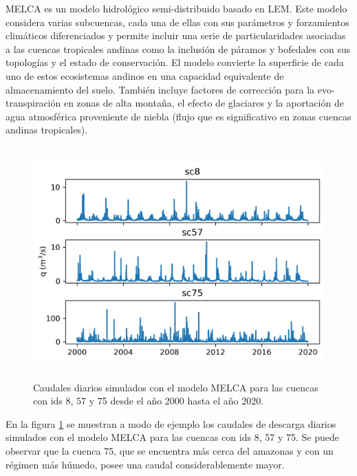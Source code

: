 MELCA es un modelo hidrológico semi-distribuido basado en LEM. 
Este modelo considera varias subcuencas, cada una de ellas con sus parámetros y forzamientos climáticos diferenciados
y permite incluir una serie de particularidades asociadas a las cuencas tropicales andinas como la inclusión de páramos 
y bofedales con sus topologías y el estado de conservación. El modelo convierte la superficie de cada uno de estos 
ecosistemas andinos en una capacidad equivalente de almacenamiento del suelo. 
También  incluye factores de corrección para  la evo-transpiración en zonas de alta montaña, el efecto de glaciares 
y la aportación de agua atmosférica proveniente de niebla (flujo que es significativo en zonas cuencas andinas tropicales). 


\begin{figure}[h!]
    \begin{center}
      \includegraphics[height=3.5in]{Figures/caudales.png}
      \caption{ Caudales diarios simulados con el modelo MELCA para las cuencas con ids 8, 57 y 75 desde el año 2000 hasta
      el año 2020. }
      \label{caudales}
    \end{center}
  \end{figure}

En la figura \ref{caudales} se muestran a modo de ejemplo los caudales de descarga diarios simulados con el modelo MELCA 
para las cuencas con ids 8, 57 y 75. Se puede observar que la cuenca 75, que se encuentra más cerca del amazonas y con 
un régimen más húmedo, posee una caudal considerablemente mayor.

